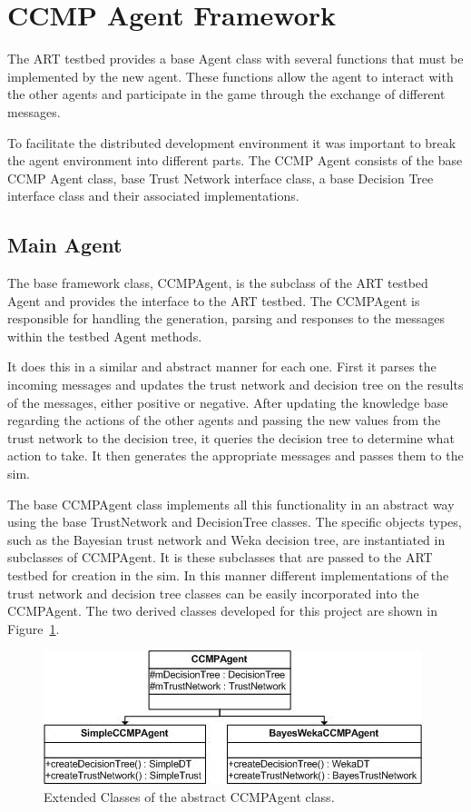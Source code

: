 \section{CCMP Agent Framework}
The ART testbed provides a base Agent class with several functions that must be
implemented by the new agent. These functions allow the agent to interact with
the other agents and participate in the game through the exchange of different
messages.  

To facilitate the distributed development environment it was important to break
the agent environment into different parts.  The CCMP Agent consists of the
base CCMP Agent class, base Trust Network interface class, a base Decision
Tree interface class and their associated implementations.

\subsection{Main Agent}
The base framework class, CCMPAgent, is the subclass of the ART testbed Agent
and provides the interface to the ART testbed.  The CCMPAgent is
responsible for handling the generation, parsing and responses to the
messages within the testbed Agent methods.  

It does this in a similar and abstract manner for each one. First it parses the
incoming messages and updates the trust network and decision tree on the
results of the messages, either positive or negative.  After updating the
knowledge base regarding the actions of the other agents and passing the new
values from the trust network to the decision tree, it queries the decision tree
to determine what action to take.  It then generates the appropriate
messages and passes them to the sim.

The base CCMPAgent class implements all this functionality in an abstract way
using the base TrustNetwork and DecisionTree classes.  The specific objects
types, such as the Bayesian trust network and Weka decision tree, are
instantiated in subclasses of CCMPAgent.  It is these subclasses that are passed
to the ART testbed for creation in the sim.  In this manner different
implementations of the trust network and decision tree classes can be easily
incorporated into the CCMPAgent.  The two derived classes developed for this 
project are shown in Figure~\ref{fig:CCMPClasses}.

\begin{figure}
\centering
\includegraphics{images/CCMPClasses.jpg}
\caption{Extended Classes of the abstract CCMPAgent class.}
\label{fig:CCMPClasses}
\end{figure}

